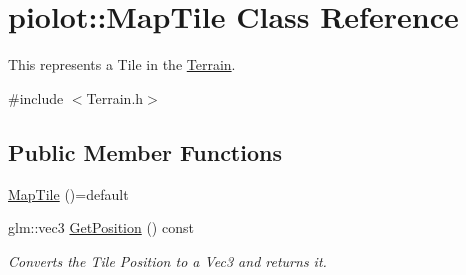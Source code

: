 \hypertarget{classpiolot_1_1_map_tile}{}\section{piolot\+:\+:Map\+Tile Class Reference}
\label{classpiolot_1_1_map_tile}


This represents a Tile in the \mbox{\hyperlink{classpiolot_1_1_terrain}{Terrain}}.  




{\ttfamily \#include $<$Terrain.\+h$>$}

\subsection*{Public Member Functions}
\begin{DoxyCompactItemize}
\item 
\mbox{\hyperlink{classpiolot_1_1_map_tile_af673d44bd4ea54b760d423bdf4730194}{Map\+Tile}} ()=default
\item 
glm\+::vec3 \mbox{\hyperlink{classpiolot_1_1_map_tile_a7c9e9f16474de4e82689811afc1ac123}{Get\+Position}} () const
\begin{DoxyCompactList}\small\item\em Converts the Tile Position to a Vec3 and returns it. \end{DoxyCompactList}\end{DoxyCompactItemize}
